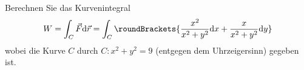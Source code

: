 \begin{atiTask}[
  title = Wegintegrale berechnen
]
  \providecommand{\D}{\mathrm{d}}
  Berechnen Sie das Kurvenintegral
\begin{equation*}
W=\int_C \vec{F} \D\vec{r}=\int _C\roundBrackets{\frac{x^2}{x^2+y^2}\D x+\frac{x}{x^2+y^2}\D y}
\end{equation*}
wobei die Kurve $C$ durch $C: x^2+y^2=9$ (entgegen dem Uhrzeigersinn) gegeben ist.
\end{atiTask}

